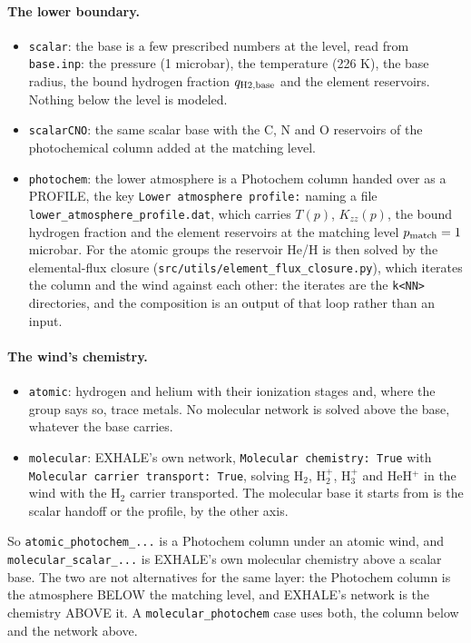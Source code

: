 \documentclass[11pt]{my_memo}
\begin{document}
\paragraph{The lower boundary.}
\begin{itemize}
\item \texttt{scalar}: the base is a few prescribed numbers at the level,
      read from \texttt{base.inp}: the pressure (1 microbar), the temperature
      (226 K), the base radius, the bound hydrogen fraction $q_{\rm H2,base}$
      and the element reservoirs. Nothing below the level is modeled.
\item \texttt{scalarCNO}: the same scalar base with the C, N and O reservoirs
      of the photochemical column added at the matching level.
\item \texttt{photochem}: the lower atmosphere is a Photochem column handed
      over as a PROFILE, the key \texttt{Lower atmosphere profile:} naming a
      file \texttt{lower\_atmosphere\_profile.dat}, which carries $T(p)$, $K_{zz}(p)$, the
      bound hydrogen fraction and the element reservoirs at the matching
      level $p_{\rm match} = 1$ microbar. For the atomic groups the reservoir
      He/H is then solved by the elemental-flux closure
      (\texttt{src/utils/element\_flux\_closure.py}), which iterates the
      column and the wind against each other: the iterates are the
      \texttt{k<NN>} directories, and the composition is an output of that
      loop rather than an input.
\end{itemize}

\paragraph{The wind's chemistry.}
\begin{itemize}
\item \texttt{atomic}: hydrogen and helium with their ionization stages and,
      where the group says so, trace metals. No molecular network is solved
      above the base, whatever the base carries.
\item \texttt{molecular}: EXHALE's own network, \texttt{Molecular chemistry:
      True} with \texttt{Molecular carrier transport: True}, solving H$_2$,
      H$_2^+$, H$_3^+$ and HeH$^+$ in the wind with the H$_2$ carrier
      transported. The molecular base it starts from is the scalar handoff or
      the profile, by the other axis.
\end{itemize}

\noindent
So \texttt{atomic\_photochem\_...} is a Photochem column under an atomic
wind, and \texttt{molecular\_scalar\_...} is EXHALE's own molecular chemistry
above a scalar base. The two are not alternatives for the same layer: the
Photochem column is the atmosphere BELOW the matching level, and EXHALE's
network is the chemistry ABOVE it. A \texttt{molecular\_photochem} case uses
both, the column below and the network above.
\end{document}
